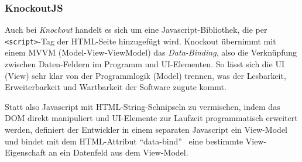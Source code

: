 \subsubsection{KnockoutJS}
Auch bei \emph{Knockout} handelt es sich um eine Javascript-Bibliothek, die per \mbox{\texttt{<script>}-Tag} der HTML-Seite hinzugefügt wird. Knockout übernimmt mit einem MVVM (Model-View-ViewModel) das \emph{Data-Binding}, also die Verknüpfung zwischen Daten-Feldern im Programm und UI-Elementen.
So lässt sich die UI (View) sehr klar von der Programmlogik (Model) trennen, was der Lesbarkeit, Erweiterbarkeit und Wartbarkeit der Software zugute kommt.

Statt also Javascript mit HTML-String-Schnipseln zu vermischen, indem das DOM direkt manipuliert und UI-Elemente zur Laufzeit
programmatisch erweitert werden, definiert der Entwickler in einem separaten Javascript ein View-Model und bindet mit dem HTML-Attribut \enquote{data-bind} \ eine bestimmte View-Eigenschaft an ein Datenfeld aus dem View-Model.

